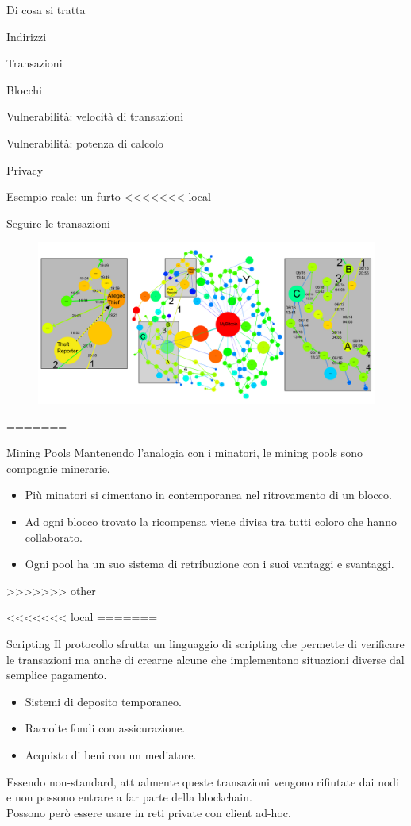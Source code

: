 \documentclass[italian]{beamer}
\begin{document}
\begin{frame}{Di cosa si tratta}
\begin{frame}{Indirizzi}
\begin{frame}{Transazioni}
\begin{frame}{Blocchi}
\begin{frame}{Vulnerabilità: velocità di transazioni}
\begin{frame}{Vulnerabilità: potenza di calcolo}
\begin{frame}{Privacy}
\begin{frame}{Esempio reale: un furto}
<<<<<<< local
\begin{frame}{Seguire le transazioni} %
\begin{figure}[htbp]
\centering
\includegraphics[width=\textwidth]{anonimato_1_13.PNG}
\end{figure}
=======
\begin{frame}{Mining Pools}
  Mantenendo l'analogia con i minatori, le mining pools sono compagnie minerarie.
 \begin{itemize}
  \item Più minatori si cimentano in contemporanea nel ritrovamento di un blocco.
  \item Ad ogni blocco trovato la ricompensa viene divisa tra tutti coloro che hanno collaborato.
  \item Ogni pool ha un suo sistema di retribuzione con i suoi vantaggi e svantaggi.
 \end{itemize}
>>>>>>> other
\end{frame}

<<<<<<< local
=======
\begin{frame}{Scripting}
Il protocollo sfrutta un linguaggio di scripting che permette di verificare le transazioni ma anche di crearne alcune che implementano situazioni diverse dal semplice pagamento.
\begin{itemize}
\item Sistemi di deposito temporaneo.
\item Raccolte fondi con assicurazione.
\item Acquisto di beni con un mediatore.
\end{itemize}
\bigskip
\pause
Essendo non-standard, attualmente queste transazioni vengono rifiutate dai nodi e non possono entrare a far parte della blockchain.\\
Possono però essere usare in reti private con client ad-hoc.
\end{frame}


\end{frame}
\end{frame}
\end{frame}
\end{frame}
\end{frame}
\end{frame}
\end{frame}
\end{frame}
\end{frame}
\end{document}
